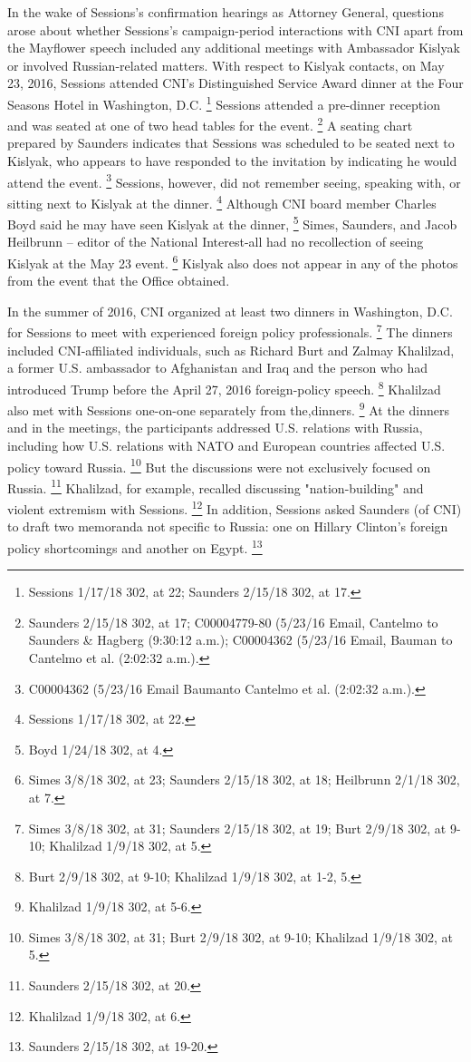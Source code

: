 In the wake of Sessions's confirmation hearings as Attorney General, questions arose about whether Sessions's campaign-period interactions with CNI apart from the Mayflower speech included any additional meetings with Ambassador Kislyak or involved Russian-related matters.
With respect to Kislyak contacts, on May 23, 2016, Sessions attended CNI's Distinguished Service Award dinner at the Four Seasons Hotel in Washington, D.C.%
\footnote{Sessions 1/17/18 302, at 22; 
Saunders 2/15/18 302, at 17.}
Sessions attended a pre-dinner reception and was seated at one of two head tables for the event.%
\footnote{Saunders 2/15/18 302, at 17; 
C00004779-80 (5/23/16 Email, Cantelmo to Saunders \& Hagberg (9:30:12 a.m.); 
C00004362 (5/23/16 Email, Bauman to Cantelmo et al. (2:02:32 a.m.).}
A seating chart prepared by Saunders indicates that Sessions was scheduled to be seated next to Kislyak, who appears to have responded to the invitation by indicating he would attend the event.%
\footnote{C00004362 (5/23/16 Email Baumanto Cantelmo et al. (2:02:32 a.m.).}
Sessions, however, did not remember seeing, speaking with, or sitting next to Kislyak at the dinner.%
\footnote{Sessions 1/17/18 302, at 22.}
Although CNI board member Charles Boyd said he may have seen Kislyak at the dinner,%
\footnote{Boyd 1/24/18 302, at 4.}
Simes, Saunders, and Jacob Heilbrunn -- editor of the National Interest-all had no recollection of seeing Kislyak at the May 23 event.%
\footnote{Simes 3/8/18 302, at 23; 
Saunders 2/15/18 302, at 18; 
Heilbrunn 2/1/18 302, at 7.}
Kislyak also does not appear in any of the photos from the event that the Office obtained.

In the summer of 2016, CNI organized at least two dinners in Washington, D.C. for Sessions to meet with experienced foreign policy professionals.%
\footnote{Simes 3/8/18 302, at 31; 
Saunders 2/15/18 302, at 19; 
Burt 2/9/18 302, at 9-10; 
Khalilzad 1/9/18 302, at 5.}
The dinners included CNI-affiliated individuals, such as Richard Burt and Zalmay Khalilzad, a former U.S. ambassador to Afghanistan and Iraq and the person who had introduced Trump before the April 27, 2016 foreign-policy speech.%
\footnote{Burt 2/9/18 302, at 9-10; 
Khalilzad 1/9/18 302, at 1-2, 5.}
Khalilzad also met with Sessions one-on-one separately from the,dinners.%
\footnote{Khalilzad 1/9/18 302, at 5-6.}
At the dinners and in the meetings, the participants addressed U.S. relations with Russia, including how U.S. relations with NATO and European countries affected U.S. policy toward Russia.%
\footnote{Simes 3/8/18 302, at 31; 
Burt 2/9/18 302, at 9-10; 
Khalilzad 1/9/18 302, at 5.}
But the discussions were not exclusively focused on Russia.%
\footnote{Saunders 2/15/18 302, at 20.}
Khalilzad, for example, recalled discussing "nation-building" and violent extremism with Sessions.%
\footnote{Khalilzad 1/9/18 302, at 6.}
In addition, Sessions asked Saunders (of CNI) to draft two memoranda not specific to Russia: one on Hillary Clinton's foreign policy shortcomings and another on Egypt.%
\footnote{Saunders 2/15/18 302, at 19-20.}

